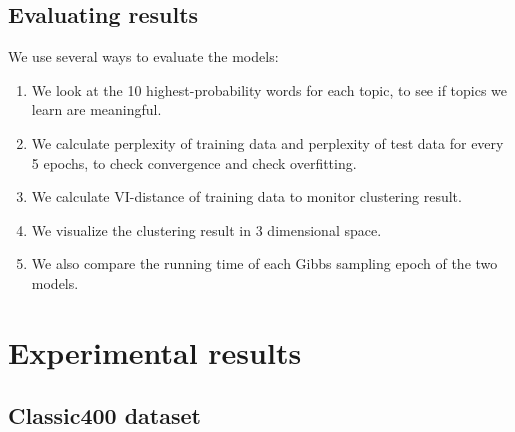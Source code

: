 \documentclass{article} %
\begin{document}
\subsection{Evaluating results}
We use several ways to evaluate the models:
\begin{enumerate}
  \item We look at the 10 highest-probability words for each topic, to see if topics we learn are meaningful.
  \item  We calculate perplexity of training data and perplexity of test data for every 5 epochs, to check convergence and check overfitting.
  \item We calculate VI-distance of training data to monitor clustering result.
  \item We visualize the clustering result in 3 dimensional space.
  \item We also compare the running time of each Gibbs sampling epoch of the two models.
\end{enumerate}

\section{Experimental results}
\subsection{Classic400 dataset}
\end{document}
